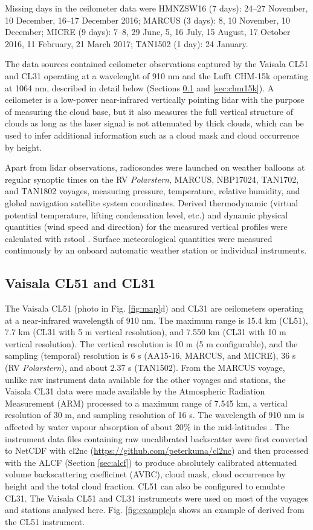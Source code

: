 \documentclass[12pt,a4paper]{article}
\begin{document}
Missing days in the ceilometer data were HMNZSW16 (7 days): 24--27 November, 10
December, 16--17 December 2016; MARCUS (3 days): 8, 10 November, 10 December;
MICRE (9 days): 7--8, 29 June, 5, 16 July, 15 August, 17 October 2016, 11
February, 21 March 2017; TAN1502 (1 day): 24 January.

The data sources contained ceilometer observations captured by the Vaisala CL51
and CL31 operating at a wavelenght of 910 nm and the Lufft CHM-15k operating at
1064 nm, described in detail below (Sections \ref{sec:cl51} and
\ref{sec:chm15k}). A ceilometer is a low-power near-infrared vertically
pointing lidar with the purpose of measuring the cloud base, but it also
measures the full vertical structure of clouds as long as the laser signal is
not attenuated by thick clouds, which can be used to infer additional
information such as a cloud mask and cloud occurrence by height.

Apart from lidar observations, radiosondes were launched on weather balloons at
regular synoptic times on the RV \emph{Polarstern}, MARCUS, NBP17024, TAN1702,
and TAN1802 voyages, measuring pressure, temperature, relative humidity, and
global navigation satellite system coordinates. Derived thermodynamic (virtual
potential temperature, lifting condensation level, etc.) and dynamic physical
quantities (wind speed and direction) for the measured vertical profiles were
calculated with rstool \citep{rstool}. Surface meteorological quantities were
measured continuously by an onboard automatic weather station or individual
instruments.

\subsection{Vaisala CL51 and CL31}
\label{sec:cl51}

The Vaisala CL51 (photo in Fig. \ref{fig:map}d) and CL31 are ceilometers
operating at a near-infrared wavelength of 910 nm. The maximum range is 15.4 km
(CL51), 7.7 km (CL31 with 5 m vertical resolution), and 7.550 km (CL31 with 10
m vertical resolution). The vertical resolution is 10 m (5 m configurable), and
the sampling (temporal) resolution is 6 s (AA15‐16, MARCUS, and MICRE), 36 s (RV
\emph{Polarstern}), and about 2.37 s (TAN1502). From the MARCUS voyage, unlike raw
instrument data available for the other voyages and stations, the Vaisala CL31
data were made available by the Atmospheric Radiation Measurement (ARM)
processed to a maximum range of 7.545 km, a vertical resolution of 30 m, and
sampling resolution of 16 s. The wavelength of 910 nm is affected by water
vapour absorption of about 20\% in the mid-latitudes
\citep{wiegner2015,wiegner2019}.  The instrument data files containing raw
uncalibrated backscatter were first converted to NetCDF with cl2nc
(\url{https://github.com/peterkuma/cl2nc}) and then processed with the ALCF
(Section \ref{sec:alcf}) to produce absolutely calibrated attenuated volume
backscattering coefficinet (AVBC), cloud mask, cloud occurrence by height and
the total cloud fraction. CL51 can also be configured to emulate CL31. The
Vaisala CL51 and CL31 instruments were used on most of the voyages and stations
analysed here. Fig. \ref{fig:example}a shows an example of derived from the
CL51 instrument.
\end{document}
